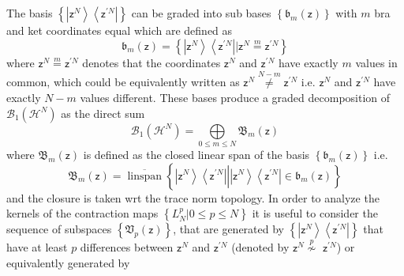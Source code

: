 \documentclass[aps,preprint]{revtex4}%
\begin{document}
The basis $\left\{  \left\vert \mathsf{z}^{N}\right\rangle \left\langle
\mathsf{z}^{\prime N}\right\vert \right\}  $ can be graded into sub bases
$\left\{  \mathfrak{b}_{m}\left(  \mathsf{z}\right)  \right\}  $ with $m$ bra
and ket coordinates equal which are defined as
\begin{equation}
\mathfrak{b}_{m}\left(  \mathsf{z}\right)  =\left\{  \left\vert \mathsf{z}%
^{N}\right\rangle \left\langle \mathsf{z}^{\prime N}\right\vert |\mathsf{z}%
^{N}\overset{m}{=}\mathsf{z}^{\prime N}\right\}
\end{equation}
where $\mathsf{z}^{N}\overset{m}{=}\mathsf{z}^{\prime N}$ denotes that the
coordinates $\mathsf{z}^{N}$ and $\mathsf{z}^{\prime N}$ have exactly $m$
values in common, which could be equivalently written as $\mathsf{z}%
^{N}\overset{N-m}{\neq}\mathsf{z}^{\prime N}$ i.e. $\mathsf{z}^{N}$ and
$\mathsf{z}^{\prime N}$ have exactly $N-m$ values different. These bases
produce a graded decomposition of $\mathcal{B}_{1}\left(  \mathcal{H}%
^{N}\right)  $ as the direct sum
\begin{equation}
\mathcal{B}_{1}\left(  \mathcal{H}^{N}\right)  =%
{\displaystyle\bigoplus\limits_{0\leq m\leq N}}
\mathfrak{B}_{m}\left(  \mathsf{z}\right)
\end{equation}
where $\mathfrak{B}_{m}\left(  \mathsf{z}\right)  $ is defined as the closed
linear span of the basis $\left\{  \mathfrak{b}_{m}\left(  \mathsf{z}\right)
\right\}  $ i.e.
\begin{equation}
\mathfrak{B}_{m}\left(  \mathsf{z}\right)  =\overline{\operatorname{linspan}%
}\left\{  \left.  \underset{}{\left\vert \mathsf{z}^{N}\right\rangle
\left\langle \mathsf{z}^{\prime N}\right\vert }\right\vert \left\vert
\mathsf{z}^{N}\right\rangle \left\langle \mathsf{z}^{\prime N}\right\vert
\in\mathfrak{b}_{m}\left(  \mathsf{z}\right)  \right\}
\end{equation}
and the closure is taken wrt the trace norm topology. In order to analyze the
kernels of the contraction maps $\left\{  L_{N}^{p}|0\leq p\leq N\right\}  $
it is useful to consider the sequence of subspaces $\left\{  \mathfrak{V}%
_{p}\left(  \mathsf{z}\right)  \right\}  $, that are generated by $\left\{
\left\vert \mathsf{z}^{N}\right\rangle \left\langle \mathsf{z}^{\prime
N}\right\vert \right\}  $ that have at least $p$ differences between
$\mathsf{z}^{N}$ and $\mathsf{z}^{\prime N}$ (denoted by $\mathsf{z}%
^{N}\overset{p}{\nsim}$ $\mathsf{z}^{\prime N}$) or equivalently generated by
\end{document}
